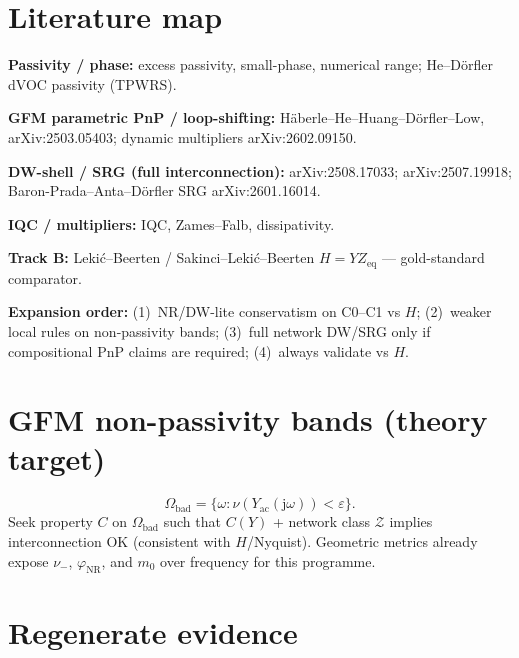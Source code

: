 \documentclass[11pt,a4paper]{article}
\theoremstyle{definition}
\newcommand{\jomega}{\mathrm{j}\omega}
\begin{document}
\section{Literature map}

\textbf{Passivity / phase:} excess passivity, small-phase, numerical range;
He--D\"orfler dVOC passivity (TPWRS).

\textbf{GFM parametric PnP / loop-shifting:}
H\"aberle--He--Huang--D\"orfler--Low, arXiv:2503.05403;
dynamic multipliers arXiv:2602.09150.

\textbf{DW-shell / SRG (full interconnection):}
arXiv:2508.17033; arXiv:2507.19918;
Baron-Prada--Anta--D\"orfler SRG arXiv:2601.16014.

\textbf{IQC / multipliers:} IQC, Zames--Falb, dissipativity.

\textbf{Track B:} Leki\'c--Beerten / Sakinci--Leki\'c--Beerten
$H=YZ_{\mathrm{eq}}$ --- gold-standard comparator.

\textbf{Expansion order:}
(1)~NR/DW-lite conservatism on C0--C1 vs $H$;
(2)~weaker local rules on non-passivity bands;
(3)~full network DW/SRG only if compositional PnP claims are required;
(4)~always validate vs $H$.

\section{GFM non-passivity bands (theory target)}

\[
  \Omega_{\mathrm{bad}}=\{\omega:\nu(Y_{\mathrm{ac}}(\jomega))<\varepsilon\}.
\]
Seek property $C$ on $\Omega_{\mathrm{bad}}$ such that
$C(Y)$ + network class $\mathcal{Z}$ implies interconnection OK
(consistent with $H$/Nyquist). Geometric metrics already expose
$\nu_-$, $\varphi_{\mathrm{NR}}$, and $m_0$ over frequency for this programme.

\section{Regenerate evidence}
\end{document}
